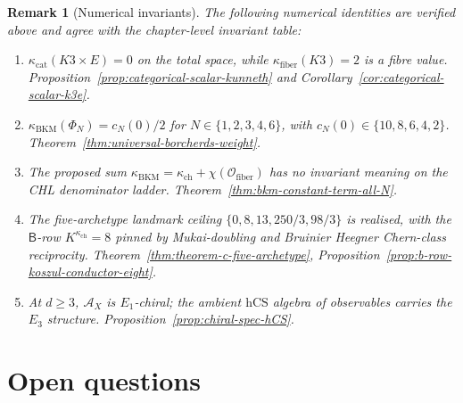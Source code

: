 \documentclass[11pt]{article}
\newtheorem{remark}[theorem]{Remark}
\newcommand{\cO}{\mathcal{O}}
\newcommand{\cA}{\mathcal{A}}
\newcommand{\hCS}{\mathrm{hCS}}
\begin{document}
\begin{remark}[Numerical invariants]
\label{rem:numerical-invariants}
The following numerical identities are verified above and agree with
the chapter-level invariant table:
\begin{enumerate}
\item $\kappa_{\mathrm{cat}}(K3\times E)=0$ on the total space, while
$\kappa_{\mathrm{fiber}}(K3)=2$ is a fibre value.
Proposition~\ref{prop:categorical-scalar-kunneth} and
Corollary~\ref{cor:categorical-scalar-k3e}.
\item $\kappa_{\mathrm{BKM}}(\Phi_N)=c_N(0)/2$ for
$N\in\{1,2,3,4,6\}$, with
$c_N(0)\in\{10,8,6,4,2\}$.
Theorem~\ref{thm:universal-borcherds-weight}.
\item The proposed sum
$\kappa_{\mathrm{BKM}}=\kappa_{\mathrm{ch}}+\chi(\cO_{\mathrm{fiber}})$
has no invariant meaning on the CHL denominator ladder.
Theorem~\ref{thm:bkm-constant-term-all-N}.
\item The five-archetype landmark ceiling
$\{0,8,13,250/3,98/3\}$ is realised, with the
$\mathsf{B}$-row $K^{\kappa_{\mathrm{ch}}}=8$ pinned by
Mukai-doubling and Bruinier Heegner Chern-class reciprocity.
Theorem~\ref{thm:theorem-c-five-archetype},
Proposition~\ref{prop:b-row-koszul-conductor-eight}.
\item At $d\geq 3$, $\cA_X$ is $E_1$-chiral; the ambient $\hCS$ algebra
of observables carries the $E_3$ structure.
Proposition~\ref{prop:chiral-spec-hCS}.
\end{enumerate}
\end{remark}

\section{Open questions}
\label{sec:open-questions}
\end{document}
